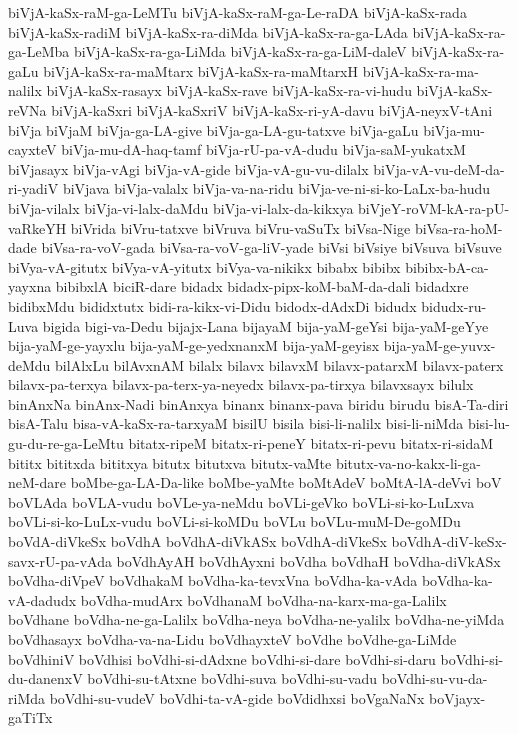 {biVjA-kaSx-raM-ga-LeMTu
biVjA-kaSx-raM-ga-Le-raDA
biVjA-kaSx-rada
biVjA-kaSx-radiM
biVjA-kaSx-ra-diMda
biVjA-kaSx-ra-ga-LAda
biVjA-kaSx-ra-ga-LeMba
biVjA-kaSx-ra-ga-LiMda
biVjA-kaSx-ra-ga-LiM-daleV
biVjA-kaSx-ra-gaLu
biVjA-kaSx-ra-maMtarx
biVjA-kaSx-ra-maMtarxH
biVjA-kaSx-ra-ma-nalilx
biVjA-kaSx-rasayx
biVjA-kaSx-rave
biVjA-kaSx-ra-vi-hudu
biVjA-kaSx-reVNa
biVjA-kaSxri
biVjA-kaSxriV
biVjA-kaSx-ri-yA-davu
biVjA-neyxV-tAni
biVja
biVjaM
biVja-ga-LA-give
biVja-ga-LA-gu-tatxve
biVja-gaLu
biVja-mu-cayxteV
biVja-mu-dA-haq-tamf
biVja-rU-pa-vA-dudu
biVja-saM-yukatxM
biVjasayx
biVja-vAgi
biVja-vA-gide
biVja-vA-gu-vu-dilalx
biVja-vA-vu-deM-da-ri-yadiV
biVjava
biVja-valalx
biVja-va-na-ridu
biVja-ve-ni-si-ko-LaLx-ba-hudu
biVja-vilalx
biVja-vi-lalx-daMdu
biVja-vi-lalx-da-kikxya
biVjeY-roVM-kA-ra-pU-vaRkeYH
biVrida
biVru-tatxve
biVruva
biVru-vaSuTx
biVsa-Nige
biVsa-ra-hoM-dade
biVsa-ra-voV-gada
biVsa-ra-voV-ga-liV-yade
biVsi
biVsiye
biVsuva
biVsuve
biVya-vA-gitutx
biVya-vA-yitutx
biVya-va-nikikx
bibabx
bibibx
bibibx-bA-ca-yayxna
bibibxlA
biciR-dare
bidadx
bidadx-pipx-koM-baM-da-dali
bidadxre
bidibxMdu
bididxtutx
bidi-ra-kikx-vi-Didu
bidodx-dAdxDi
bidudx
bidudx-ru-Luva
bigida
bigi-va-Dedu
bijajx-Lana
bijayaM
bija-yaM-geYsi
bija-yaM-geYye
bija-yaM-ge-yayxlu
bija-yaM-ge-yedxnanxM
bija-yaM-geyisx
bija-yaM-ge-yuvx-deMdu
bilAlxLu
bilAvxnAM
bilalx
bilavx
bilavxM
bilavx-patarxM
bilavx-paterx
bilavx-pa-terxya
bilavx-pa-terx-ya-neyedx
bilavx-pa-tirxya
bilavxsayx
bilulx
binAnxNa
binAnx-Nadi
binAnxya
binanx
binanx-pava
biridu
birudu
bisA-Ta-diri
bisA-Talu
bisa-vA-kaSx-ra-tarxyaM
bisilU
bisila
bisi-li-nalilx
bisi-li-niMda
bisi-lu-gu-du-re-ga-LeMtu
bitatx-ripeM
bitatx-ri-peneY
bitatx-ri-pevu
bitatx-ri-sidaM
bititx
bititxda
bititxya
bitutx
bitutxva
bitutx-vaMte
bitutx-va-no-kakx-li-ga-neM-dare
boMbe-ga-LA-Da-like
boMbe-yaMte
boMtAdeV
boMtA-lA-deVvi
boV
boVLAda
boVLA-vudu
boVLe-ya-neMdu
boVLi-geVko
boVLi-si-ko-LuLxva
boVLi-si-ko-LuLx-vudu
boVLi-si-koMDu
boVLu
boVLu-muM-De-goMDu
boVdA-diVkeSx
boVdhA
boVdhA-diVkASx
boVdhA-diVkeSx
boVdhA-diV-keSx-savx-rU-pa-vAda
boVdhAyAH
boVdhAyxni
boVdha
boVdhaH
boVdha-diVkASx
boVdha-diVpeV
boVdhakaM
boVdha-ka-tevxVna
boVdha-ka-vAda
boVdha-ka-vA-dadudx
boVdha-mudArx
boVdhanaM
boVdha-na-karx-ma-ga-Lalilx
boVdhane
boVdha-ne-ga-Lalilx
boVdha-neya
boVdha-ne-yalilx
boVdha-ne-yiMda
boVdhasayx
boVdha-va-na-Lidu
boVdhayxteV
boVdhe
boVdhe-ga-LiMde
boVdhiniV
boVdhisi
boVdhi-si-dAdxne
boVdhi-si-dare
boVdhi-si-daru
boVdhi-si-du-danenxV
boVdhi-su-tAtxne
boVdhi-suva
boVdhi-su-vadu
boVdhi-su-vu-da-riMda
boVdhi-su-vudeV
boVdhi-ta-vA-gide
boVdidhxsi
boVgaNaNx
boVjayx-gaTiTx
}
